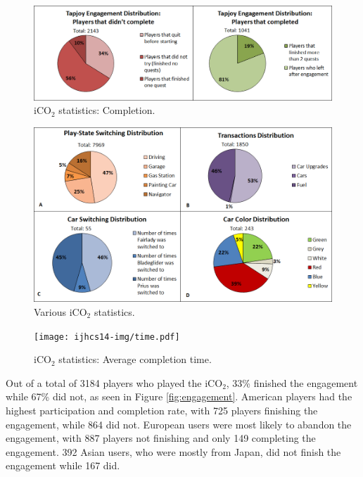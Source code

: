 \documentclass[preprint,authoryear,12pt]{elsarticle}
\begin{document}
\begin{figure}[htb]
	\begin{center}
		\includegraphics[width=.95\linewidth]{ijhcs14-img/completion}
		\caption{iCO$_2$ statistics: Completion.\label{fig:completion}}
	\end{center}
\end{figure}


\begin{figure}[htb]
	\begin{center}
		\includegraphics[width=.95\linewidth]{ijhcs14-img/4diagrams2}
		\caption{Various iCO$_2$ statistics.\label{fig:4diagrams}}
	\end{center}
\end{figure}

\begin{figure}[htb]
	\begin{center}
		\texttt{[image: ijhcs14-img/time.pdf]}
		\caption{iCO$_2$ statistics: Average completion time.\label{fig:time}}
	\end{center}
\end{figure}


Out of a total of 3184 players who played the iCO$_2$, 33\% finished the engagement while 67\% did not, as seen in Figure \ref{fig:engagement}. American players had the highest participation and completion rate, with 725 players finishing the engagement, while 864 did not. European users were most likely to abandon the engagement, with 887 players not finishing and only 149 completing the engagement. 392 Asian users, who were mostly from Japan, did not finish the engagement while 167 did.
\end{document}
